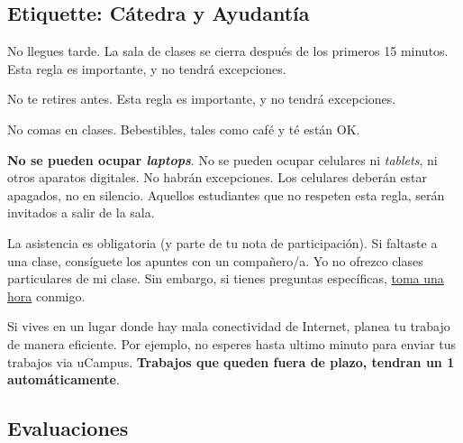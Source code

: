 \documentclass[letterpaper]{article}
\renewenvironment{itemize}{
  \begin{list}{}{
    \setlength{\leftmargin}{1.5em}
  }
}{
  \end{list}
}
\begin{document}
\subsection*{Etiquette: C\'atedra y Ayudant\'ia}
 

\begin{itemize}
	\item[$\bullet$] No llegues tarde. La sala de clases se cierra despu\'es de los primeros 15 minutos. Esta regla es importante, y no tendr\'a excepciones.
  \item[$\bullet$] No te retires antes. Esta regla es importante, y no tendr\'a excepciones.
	\item[$\bullet$] No comas en clases. Bebestibles, tales como caf\'e y t\'e est\'an OK.
	\item[$\bullet$] {\bf No se pueden ocupar \emph{laptops}}. No se pueden ocupar celulares ni \emph{tablets}, ni otros aparatos digitales. No habr\'an excepciones. Los celulares deber\'an estar apagados, no en silencio. Aquellos estudiantes que no respeten esta regla, ser\'an invitados a salir de la sala. %
	\item[$\bullet$] La asistencia es obligatoria (y parte de tu nota de participaci\'on). Si faltaste a una clase, cons\'iguete los apuntes con un compa\~nero/a. Yo no ofrezco clases particulares de mi clase. Sin embargo, si tienes preguntas espec\'ificas, \href{https://calendly.com/bahamonde/officehours}{toma una hora} conmigo. 
	\item[{\color{red}\Pointinghand}] Si vives en un lugar donde hay mala conectividad de Internet, planea tu trabajo de manera eficiente. Por ejemplo, no esperes hasta ultimo minuto para enviar tus trabajos via uCampus. {\bf Trabajos que queden fuera de plazo, tendran un 1 autom\'aticamente}.
\end{itemize}



\subsection*{Evaluaciones}
\end{document}
